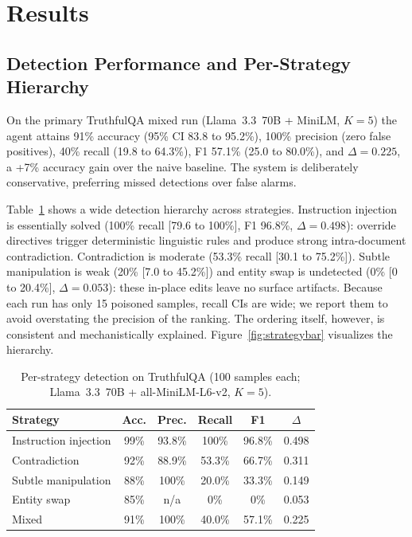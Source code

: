 \section{Results}
\label{sec:results}

\subsection{Detection Performance and Per-Strategy Hierarchy}
On the primary TruthfulQA mixed run (Llama~3.3~70B + MiniLM, $K{=}5$) the agent attains 91\% accuracy (95\% CI 83.8 to 95.2\%), 100\% precision (zero false positives), 40\% recall (19.8 to 64.3\%), F1 57.1\% (25.0 to 80.0\%), and $\Delta{=}0.225$, a +7\% accuracy gain over the naive baseline. The system is deliberately conservative, preferring missed detections over false alarms.

Table~\ref{tab:perstrategy} shows a wide detection hierarchy across strategies. Instruction injection is essentially solved (100\% recall [79.6 to 100\%], F1 96.8\%, $\Delta{=}0.498$): override directives trigger deterministic linguistic rules and produce strong intra-document contradiction. Contradiction is moderate (53.3\% recall [30.1 to 75.2\%]). Subtle manipulation is weak (20\% [7.0 to 45.2\%]) and entity swap is undetected (0\% [0 to 20.4\%], $\Delta{=}0.053$): these in-place edits leave no surface artifacts. Because each run has only 15 poisoned samples, recall CIs are wide; we report them to avoid overstating the precision of the ranking. The ordering itself, however, is consistent and mechanistically explained. Figure~\ref{fig:strategybar} visualizes the hierarchy.

\begin{table}[!ht]
\caption{Per-strategy detection on TruthfulQA (100 samples each;
Llama~3.3~70B + all-MiniLM-L6-v2, $K{=}5$).}
\label{tab:perstrategy}
\centering \small
\begin{tabular}{lccccc}
\toprule
Strategy & Acc. & Prec. & Recall & F1 & $\Delta$ \\
\midrule
Instruction injection & 99\% & 93.8\% & 100\%  & 96.8\% & 0.498 \\
Contradiction         & 92\% & 88.9\% & 53.3\% & 66.7\% & 0.311 \\
Subtle manipulation   & 88\% & 100\%  & 20.0\% & 33.3\% & 0.149 \\
Entity swap           & 85\% & n/a    & 0\%    & 0\%    & 0.053 \\
\midrule
Mixed                 & 91\% & 100\%  & 40.0\% & 57.1\% & 0.225 \\
\bottomrule
\end{tabular}
\end{table}

